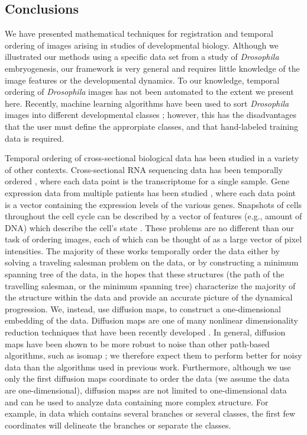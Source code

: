 \documentclass{pnastwo}
\begin{document}
\begin{article}
\section{Conclusions}

We have presented mathematical techniques for registration and temporal ordering of images arising in studies of developmental biology.
%
Although we illustrated our methods using a specific data set from a study of {\em Drosophila} embryogenesis, our framework is very general and requires little knowledge of the image features or the developmental dynamics.
%
To our knowledge, temporal ordering of {\em Drosophila} images has not been automated to the extent we present here.
%
Recently, machine learning algorithms have been used to sort {\em Drosophila} images into different developmental classes \cite{yuan2014automated};
however, this has the disadvantages that the user must define the approrpiate classes, and that hand-labeled training data is required.

Temporal ordering of cross-sectional biological data has been studied in a variety of other contexts.
%
Cross-sectional RNA sequencing data has been temporally ordered \cite{anavy2014blind}, where each data point is the transcriptome for a single sample.
%
Gene expression data from multiple patients has been studied \cite{gupta2008extracting} \cite{qiu2011discovering},
%
where each data point is a vector containing the expression levels of the various genes.
%
Snapshots of cells throughout the cell cycle can be described by a vector of features (e.g., amount of DNA) which describe the cell's state  \cite{kafri2013dynamics}.
%
These problems are no different than our task of ordering images, each of which can be thought of as a large vector of pixel intensities. 
%
The majority of these works temporally order the data either by solving a traveling salesman problem on the data, or by constructing a minimum spanning tree of the data, 
in the hopes that these structures (the path of the travelling salesman, or the minimum spanning tree) characterize the majority of the structure within the data and provide an accurate picture of the dynamical progression.
%
We, instead, use diffusion maps, to construct a one-dimensional embedding of the data.
%
Diffusion maps are one of many nonlinear dimensionality reduction techniques that have been recently developed \cite{Belkin2003} \cite{tenenbaum2000global} \cite{Donoho2003} \cite{Roweis2000}.
%
In general, diffusion maps have been shown to be more robust to noise than other path-based algorithms, such as isomap \cite{tenenbaum2000global} \cite{balasubramanian2002isomap}; we therefore expect them to perform better for noisy data than the algorithms used in previous work.
%
Furthermore, although we use only the first diffusion maps coordinate to order the data (we assume the data are one-dimensional), diffusion mapss are not limited to one-dimensional data and can be used to analyze data containing more complex structure.
%
For example, in data which contains several branches or several classes, the first few coordinates will delineate the branches or separate the classes.


\end{article}
\end{document}
